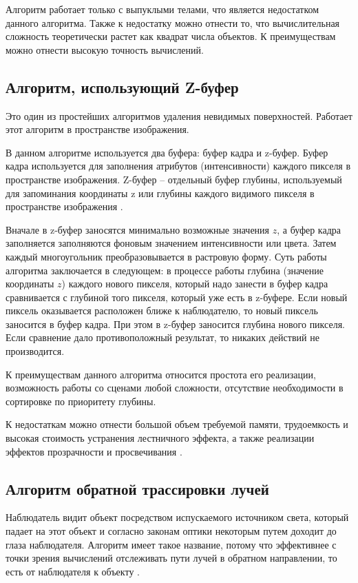 Алгоритм работает только с выпуклыми телами, что является недостатком данного алгоритма. Также к недостатку можно отнести то, что вычислительная сложность теоретически растет как квадрат числа объектов. К преимуществам можно отнести высокую точность вычислений.

\subsection{Алгоритм, использующий Z-буфер}

Это один из простейших алгоритмов удаления невидимых поверхностей. Работает этот алгоритм в пространстве изображения\cite{info_rodjers}. 

В данном алгоритме используется два буфера: буфер кадра и z-буфер. Буфер кадра используется для заполнения атрибутов (интенсивности) каждого пикселя в пространстве изображения. Z-буфер -- отдельный буфер глубины, используемый для запоминания координаты z или глубины каждого видимого пикселя в пространстве изображения \cite{info_rodjers}.

Вначале в z-буфер заносятся минимально возможные значения $z$, а буфер
кадра заполняется заполняются фоновым значением интенсивности или цвета.
Затем каждый многоугольник преобразовывается в растровую форму. 
Суть работы алгоритма заключается в следующем: в процессе работы глубина
(значение координаты $z$) каждого нового пикселя, который надо занести в буфер кадра сравнивается с глубиной того пикселя, который уже есть в z-буфере. 
Если новый пиксель оказывается расположен ближе к наблюдателю, то новый пиксель заносится в буфер кадра. При этом в z-буфер заносится глубина нового пикселя.
Если сравнение дало противоположный результат, то никаких действий не
производится. 

К преимуществам данного алгоритма относится простота его реализации, возможность работы со сценами любой сложности, отсутствие необходимости в сортировке по приоритету глубины.

К недостаткам можно отнести большой объем требуемой памяти, трудоемкость и высокая стоимость устранения лестничного эффекта, а также реализации эффектов прозрачности и просвечивания \cite{info_rodjers}.

\subsection{Алгоритм обратной трассировки лучей}

Наблюдатель видит объект посредством испускаемого источником света,
который падает на этот объект и согласно законам оптики некоторым путем
доходит до глаза наблюдателя. Алгоритм имеет такое название, потому что
эффективнее с точки зрения вычислений отслеживать пути лучей в обратном
направлении, то есть от наблюдателя к объекту \cite{info_rodjers}.

